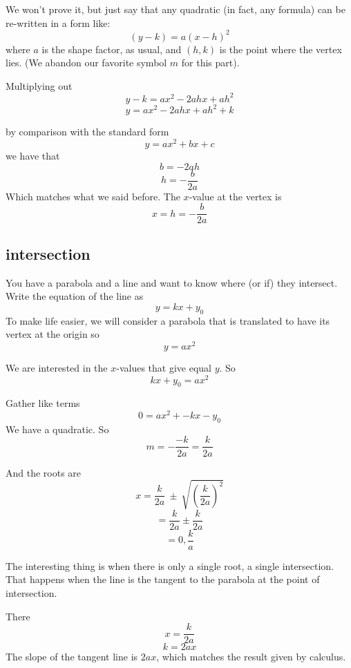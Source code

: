 \documentclass[11pt, oneside]{article}
\begin{document}
We won't prove it, but just say that any quadratic (in fact, any formula) can be re-written in a form like:
\[ (y - k) = a(x - h)^2 \]
where $a$ is the shape factor, as usual, and $(h,k)$ is the point where the vertex lies.  (We abandon our favorite symbol $m$ for this part).

Multiplying out
\[ y - k = ax^2 - 2ahx + ah^2 \]
\[ y = ax^2 - 2ahx + ah^2 + k \]

by comparison with the standard form
\[ y = ax^2 + bx + c \]
we have that 
\[ b = -2ah \]
\[ h = - \frac{b}{2a} \]
Which matches what we said before.  The $x$-value at the vertex is 
\[ x = h = - \frac{b}{2a} \]

\subsection*{intersection}

You have a parabola and a line and want to know where (or if) they intersect.  Write the equation of the line as
\[ y = kx + y_0 \]
To make life easier, we will consider a parabola that is translated to have its vertex at the origin so
\[ y = ax^2 \]

We are interested in the $x$-values that give equal $y$.  So
\[ kx + y_0 = ax^2 \]

Gather like terms
\[ 0 = ax^2 + - kx - y_0 \]
We have a quadratic.  So 
\[ m = - \frac{-k}{2a} = \frac{k}{2a} \]

And the roots are
\[ x = \frac{k}{2a}  \ \pm \ \sqrt{(\frac{k}{2a} )^2} \]
\[ = \frac{k}{2a}  \pm \frac{k}{2a}  \]
\[ = 0, \frac{k}{a} \]

The interesting thing is when there is only a single root, a single intersection.  That happens when the line is the tangent to the parabola at the point of intersection.

There
\[ x = \frac{k}{2a} \]
\[ k = 2ax \]
The slope of the tangent line is $2ax$, which matches the result given by calculus.
\end{document}
